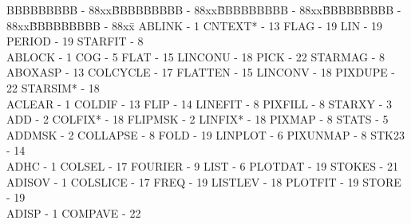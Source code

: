 {\scriptsize
\begin{tabbing}
BBBBBBBBB - 88xx\=BBBBBBBBB - 88xx\=BBBBBBBBB - 88xx\=BBBBBBBBB - 88xx\=BBBBBBBBB - 88xx\=\kill
 ABLINK - 1                              \>CNTEXT* - 13                          
   \>FLAG - 19                               \>
 LIN - 19                                \>PERIOD - 19                           
   \>STARFIT - 8                             \\
 ABLOCK - 1                              \>COG - 5                               
   \>FLAT - 15                               \>
 LINCONU - 18                            \>PICK - 22                             
   \>STARMAG - 8                             \\
 ABOXASP - 13                            \>COLCYCLE - 17                         
   \>FLATTEN - 15                            \>
 LINCONV - 18                            \>PIXDUPE - 22                          
   \>STARSIM* - 18                           \\
 ACLEAR - 1                              \>COLDIF - 13                           
   \>FLIP - 14                               \>
 LINEFIT - 8                             \>PIXFILL - 8                           
   \>STARXY - 3                              \\
 ADD - 2                                 \>COLFIX* - 18                          
   \>FLIPMSK - 2                             \>
 LINFIX* - 18                            \>PIXMAP - 8                            
   \>STATS - 5                               \\
 ADDMSK - 2                              \>COLLAPSE - 8                          
   \>FOLD - 19                               \>
 LINPLOT - 6                             \>PIXUNMAP - 8                          
   \>STK23 - 14                              \\
 ADHC - 1                                \>COLSEL - 17                           
   \>FOURIER - 9                             \>
 LIST - 6                                \>PLOTDAT - 19                          
   \>STOKES - 21                             \\
 ADISOV - 1                              \>COLSLICE - 17                         
   \>FREQ - 19                               \>
 LISTLEV - 18                            \>PLOTFIT - 19                          
   \>STORE - 19                              \\
 ADISP - 1                               \>COMPAVE - 22                          

\end{tabbing}}
